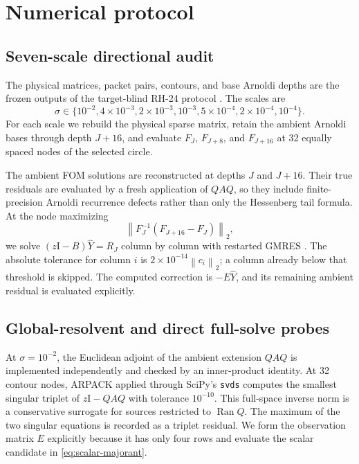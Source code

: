 \documentclass[11pt]{article}
\theoremstyle{definition}
\theoremstyle{remark}
\newcommand{\Id}{\mathrm I}
\newcommand{\Ran}{\operatorname{Ran}}
\newcommand{\norm}[1]{\left\lVert#1\right\rVert}
\begin{document}
\section{Numerical protocol}
\label{sec:protocol}

\subsection{Seven-scale directional audit}

The physical matrices, packet pairs, contours, and base Arnoldi depths are
the frozen outputs of the target-blind RH-24 protocol
\citep{WangContourFeshbach2026}.  The scales are
\[
 \sigma\in\{10^{-2},4\times10^{-3},2\times10^{-3},10^{-3},
 5\times10^{-4},2\times10^{-4},10^{-4}\}.
\]
For each scale we rebuild the physical sparse matrix, retain the ambient
Arnoldi bases through depth \(J+16\), and evaluate \(F_J\), \(F_{J+8}\),
and \(F_{J+16}\) at 32 equally spaced nodes of the selected circle.

The ambient FOM solutions are reconstructed at depths \(J\) and \(J+16\).
Their true residuals are evaluated by a fresh application of \(QAQ\), so
they include finite-precision Arnoldi recurrence defects rather than only
the Hessenberg tail formula.  At the node maximizing
\[
 \norm{F_J^{-1}(F_{J+16}-F_J)}_2,
\]
we solve \((z\Id-B)\widehat Y=R_J\) column by column with restarted GMRES
\citep{SaadSchultz1986}.
The absolute tolerance for column \(i\) is
\(2\times10^{-14}\norm{c_i}_2\); a column already below that threshold is
skipped.  The computed correction is \(-E\widehat Y\), and its remaining
ambient residual is evaluated explicitly.

\subsection{Global-resolvent and direct full-solve probes}

At \(\sigma=10^{-2}\), the Euclidean adjoint of the ambient extension
\(QAQ\) is implemented independently and checked by an inner-product
identity.  At 32 contour nodes, ARPACK applied through SciPy's
\texttt{svds} computes the smallest singular triplet of
\(z\Id-QAQ\) with tolerance \(10^{-10}\).  This full-space inverse norm is
a conservative surrogate for sources restricted to \(\Ran Q\).  The maximum
of the two singular equations is recorded as a triplet residual.  We form
the observation matrix \(E\) explicitly because it has only four rows and
evaluate the scalar candidate in \cref{eq:scalar-majorant}.
\end{document}
